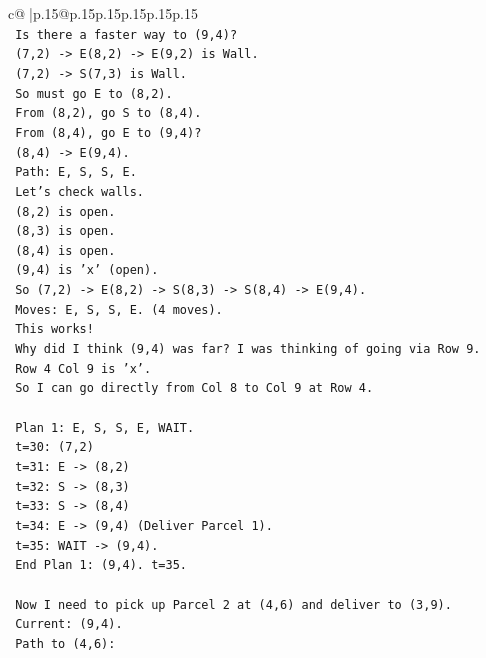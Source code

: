 \documentclass{article}
\begin{document}
{\begin{supertabular}{c@{$\;$}|p{.15\linewidth}@{}p{.15\linewidth}p{.15\linewidth}p{.15\linewidth}p{.15\linewidth}p{.15\linewidth}}
{{{\\ 
\texttt{    Is there a faster way to (9,4)?} \\
\texttt{    (7,2) {-}> E(8,2) {-}> E(9,2) is Wall.} \\
\texttt{    (7,2) {-}> S(7,3) is Wall.} \\
\texttt{    So must go E to (8,2).} \\
\texttt{    From (8,2), go S to (8,4).} \\
\texttt{    From (8,4), go E to (9,4)?} \\
\texttt{    (8,4) {-}> E(9,4).} \\
\texttt{    Path: E, S, S, E.} \\
\texttt{    Let's check walls.} \\
\texttt{    (8,2) is open.} \\
\texttt{    (8,3) is open.} \\
\texttt{    (8,4) is open.} \\
\texttt{    (9,4) is 'x' (open).} \\
\texttt{    So (7,2) {-}> E(8,2) {-}> S(8,3) {-}> S(8,4) {-}> E(9,4).} \\
\texttt{    Moves: E, S, S, E. (4 moves).} \\
\texttt{    This works!} \\
\texttt{    Why did I think (9,4) was far? I was thinking of going via Row 9.} \\
\texttt{    Row 4 Col 9 is 'x'.} \\
\texttt{    So I can go directly from Col 8 to Col 9 at Row 4.} \\
\\ 
\texttt{    Plan 1: E, S, S, E, WAIT.} \\
\texttt{    t=30: (7,2)} \\
\texttt{    t=31: E {-}> (8,2)} \\
\texttt{    t=32: S {-}> (8,3)} \\
\texttt{    t=33: S {-}> (8,4)} \\
\texttt{    t=34: E {-}> (9,4) (Deliver Parcel 1).} \\
\texttt{    t=35: WAIT {-}> (9,4).} \\
\texttt{    End Plan 1: (9,4). t=35.} \\
\\ 
\texttt{    Now I need to pick up Parcel 2 at (4,6) and deliver to (3,9).} \\
\texttt{    Current: (9,4).} \\
\texttt{    Path to (4,6):} \\
}}}
\end{supertabular}}
\end{document}
